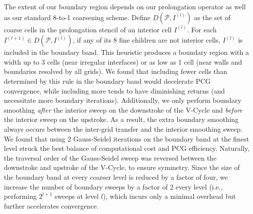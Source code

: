 The extent of our boundary region depends on our prolongation operator as well as our standard 8-to-1 coarsening scheme. Define $D(\mathcal{P},I^{(l)})$ as the set of coarse cells in the prolongation stencil of an interior cell $I^{(l)}$.  For each $I^{(l+1)}\in D(\mathcal{P},I^{(l)})$, if any of its 8 fine children are not interior cells, $I^{(l)}$ is included in the boundary band.
This heuristic produces a boundary region with a width up to 3 cells (near irregular interfaces) or as low as 1 cell (near walls and boundaries resolved by all grids).
We found that including fewer cells than determined by this rule in the boundary band would decelerate PCG convergence, while including more tends to have diminishing returns (and
necessitate more boundary iterations). 
Additionally, we only perform boundary smoothing \emph{after} the interior sweep on the downstroke of the V-Cycle and \emph{before} the interior
sweep on the upstroke. 
As a result, the extra boundary smoothing always occurs between the inter-grid transfer and the interior smoothing sweep.
We found that using 2 Gauss-Seidel
iterations on the boundary band at the finest level struck the best balance of computational cost and PCG efficiency. 
Naturally, the traversal order of the Gauss-Seidel sweep was
reversed between the downstroke and upstroke of the V-Cycle, to ensure symmetry.
Since the size of the boundary band at every coarser level is reduced by a factor of four, we
increase the number of boundary sweeps by a factor of 2 every level (i.e., performing $2^{l+1}$ sweeps at level $l$), which incurs only a minimal overhead but further accelerates convergence.

